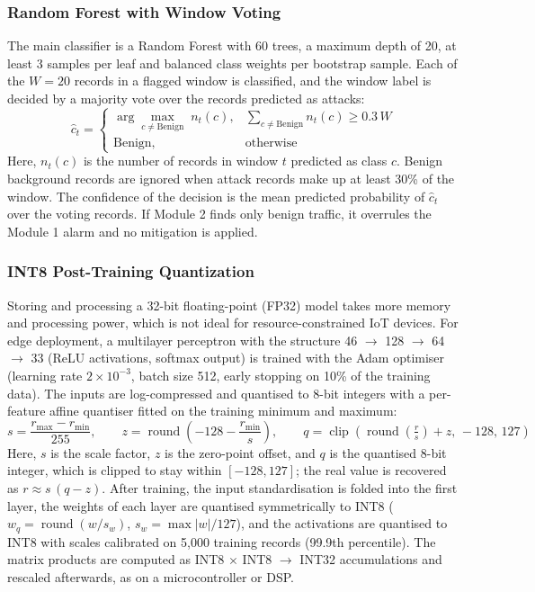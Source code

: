 \documentclass[]{interact}
\theoremstyle{plain}%
\theoremstyle{definition}
\theoremstyle{remark}
\begin{document}
\subsubsection{Random Forest with Window Voting}
The main classifier is a Random Forest with 60 trees, a maximum depth of 20, at least 3 samples per leaf and balanced class weights per bootstrap sample. Each of the $W = 20$ records in a flagged window is classified, and the window label is decided by a majority vote over the records predicted as attacks:
\begin{equation}
  \hat{c}_t =
  \begin{cases}
    \arg\max_{c \neq \text{Benign}} \; n_t(c), & \sum_{c \neq \text{Benign}} n_t(c) \ge 0.3\,W\\
    \text{Benign}, & \text{otherwise}
  \end{cases}
\end{equation}
Here, $n_t(c)$ is the number of records in window $t$ predicted as class $c$. Benign background records are ignored when attack records make up at least 30\% of the window. The confidence of the decision is the mean predicted probability of $\hat{c}_t$ over the voting records. If Module 2 finds only benign traffic, it overrules the Module 1 alarm and no mitigation is applied.

\subsubsection{INT8 Post-Training Quantization}
Storing and processing a 32-bit floating-point (FP32) model takes more memory and processing power, which is not ideal for resource-constrained IoT devices. For edge deployment, a multilayer perceptron with the structure 46 $\rightarrow$ 128 $\rightarrow$ 64 $\rightarrow$ 33 (ReLU activations, softmax output) is trained with the Adam optimiser (learning rate $2\times10^{-3}$, batch size 512, early stopping on 10\% of the training data). The inputs are log-compressed and quantised to 8-bit integers with a per-feature affine quantiser fitted on the training minimum and maximum:
\begin{equation}
  s = \frac{r_{\max}-r_{\min}}{255}, \qquad
  z = \operatorname{round}\!\left(-128 - \frac{r_{\min}}{s}\right), \qquad
  q = \operatorname{clip}\!\left(\operatorname{round}\!\left(\tfrac{r}{s}\right) + z,\,-128,\,127\right)
\end{equation}
Here, $s$ is the scale factor, $z$ is the zero-point offset, and $q$ is the quantised 8-bit integer, which is clipped to stay within $[-128, 127]$; the real value is recovered as $r \approx s\,(q - z)$. After training, the input standardisation is folded into the first layer, the weights of each layer are quantised symmetrically to INT8 ($w_q = \operatorname{round}(w / s_w)$, $s_w = \max|w| / 127$), and the activations are quantised to INT8 with scales calibrated on 5,000 training records (99.9th percentile). The matrix products are computed as INT8 $\times$ INT8 $\rightarrow$ INT32 accumulations and rescaled afterwards, as on a microcontroller or DSP.
\end{document}
